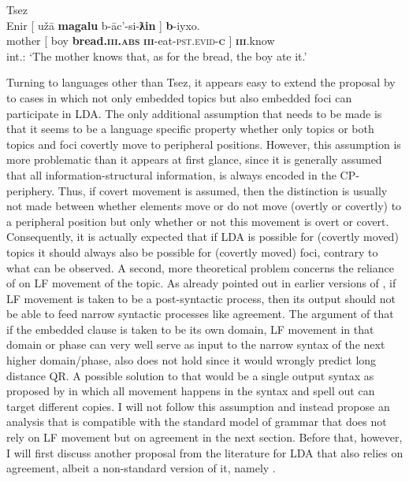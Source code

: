 \documentclass[output=paper
,modfonts
,nonflat]{langsci/langscibook}
\begin{document}
\begin{exe}
\ex Tsez \citep[][635]{Polinsky_Potsdam2001}\label{ex:tsez_comp_block_rep}\\
\gll *Enir [ u\v{z}\=a \textbf{magalu} b-\=ac’-si-\textbf{ƛin} ] \textbf{b}-iyxo.\\
mother [ boy \textbf{bread.\textsc{\textbf{iii}.abs}} \textsc{\textbf{iii}}-eat-\textsc{pst.evid}-\textsc{\textbf{c}} ]	\textsc{\textbf{iii}}.know\\
\glt int.: `The mother knows that, as for the bread, the boy ate it.'
\end{exe}
Turning to languages other than Tsez, it appears easy to extend the proposal by \citet{Polinsky_Potsdam2001} to cases in which not only embedded topics but also embedded foci can participate in LDA. The only additional assumption that needs to be made is that it seems to be a language specific property whether only topics or both topics and foci covertly move to peripheral positions. However, this assumption is more problematic than it appears at first glance, since it is generally assumed that all information-structural information, is always encoded in the CP-periphery. Thus, if covert movement is assumed, then the distinction is usually not made between whether elements move or do not move (overtly or covertly) to a peripheral position but only whether or not this movement is overt or covert. Consequently, it is actually expected that if LDA is possible for (covertly moved) topics it should always also be possible for (covertly moved) foci, contrary to what can be observed. A second, more theoretical problem concerns the reliance of \citet{Polinsky_Potsdam2001} on LF movement of the topic. As already pointed out in earlier versions of \citet{Bjorkman_Zeijlstra2014}, if LF movement is taken to be a post-syntactic process, then its output should not be able to feed narrow syntactic processes like agreement. The argument of \citet{Preminger_Polinsky2015} that if the embedded clause is taken to be its own domain, LF movement in that domain or phase can very well serve as input to the narrow syntax of the next higher domain/phase, also does not hold since it would wrongly predict long distance QR. A possible solution to that would be a single output syntax as proposed by \citet{Bobaljik2002} in which all movement happens in the syntax and spell out can target different copies. I will not follow this assumption and instead propose an analysis that is compatible with the standard model of grammar that does not rely on LF movement but on agreement in the next section. Before that, however, I will first discuss another proposal from the literature for LDA that also relies on agreement, albeit a non-standard version of it, namely \citet{Bjorkman_Zeijlstra2014}.
\end{document}
